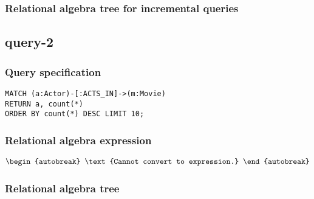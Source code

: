 \subsubsection*{Relational algebra tree for incremental queries}

\subsection{query-2}

\subsubsection*{Query specification}

\begin{lstlisting}
MATCH (a:Actor)-[:ACTS_IN]->(m:Movie)
RETURN a, count(*)
ORDER BY count(*) DESC LIMIT 10;
\end{lstlisting}

\subsubsection*{Relational algebra expression}

\begin{align*}
\begin{autobreak}
\text{Cannot convert to expression.}
\end{autobreak}
\end{align*}

\subsubsection*{Relational algebra tree}

